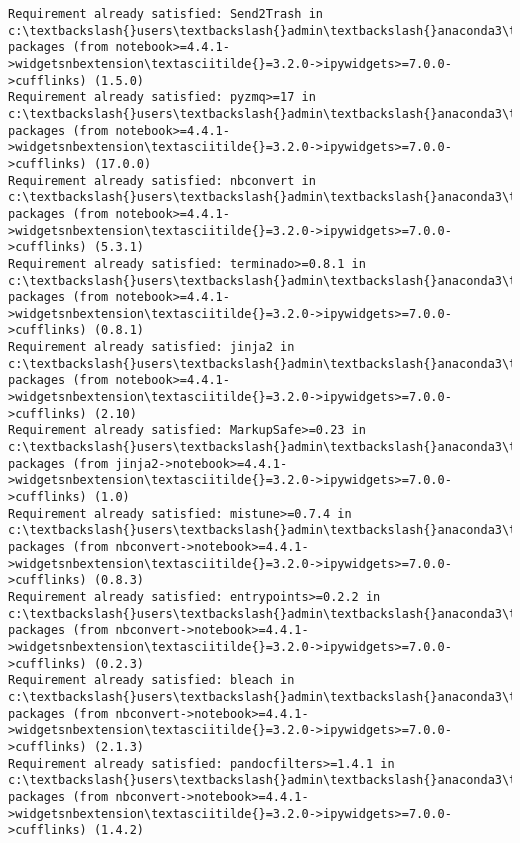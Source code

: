 \documentclass[11pt]{article}
\begin{document}
\begin{Verbatim}[commandchars=\\\{\}]
Requirement already satisfied: Send2Trash in c:\textbackslash{}users\textbackslash{}admin\textbackslash{}anaconda3\textbackslash{}lib\textbackslash{}site-packages (from notebook>=4.4.1->widgetsnbextension\textasciitilde{}=3.2.0->ipywidgets>=7.0.0->cufflinks) (1.5.0)
Requirement already satisfied: pyzmq>=17 in c:\textbackslash{}users\textbackslash{}admin\textbackslash{}anaconda3\textbackslash{}lib\textbackslash{}site-packages (from notebook>=4.4.1->widgetsnbextension\textasciitilde{}=3.2.0->ipywidgets>=7.0.0->cufflinks) (17.0.0)
Requirement already satisfied: nbconvert in c:\textbackslash{}users\textbackslash{}admin\textbackslash{}anaconda3\textbackslash{}lib\textbackslash{}site-packages (from notebook>=4.4.1->widgetsnbextension\textasciitilde{}=3.2.0->ipywidgets>=7.0.0->cufflinks) (5.3.1)
Requirement already satisfied: terminado>=0.8.1 in c:\textbackslash{}users\textbackslash{}admin\textbackslash{}anaconda3\textbackslash{}lib\textbackslash{}site-packages (from notebook>=4.4.1->widgetsnbextension\textasciitilde{}=3.2.0->ipywidgets>=7.0.0->cufflinks) (0.8.1)
Requirement already satisfied: jinja2 in c:\textbackslash{}users\textbackslash{}admin\textbackslash{}anaconda3\textbackslash{}lib\textbackslash{}site-packages (from notebook>=4.4.1->widgetsnbextension\textasciitilde{}=3.2.0->ipywidgets>=7.0.0->cufflinks) (2.10)
Requirement already satisfied: MarkupSafe>=0.23 in c:\textbackslash{}users\textbackslash{}admin\textbackslash{}anaconda3\textbackslash{}lib\textbackslash{}site-packages (from jinja2->notebook>=4.4.1->widgetsnbextension\textasciitilde{}=3.2.0->ipywidgets>=7.0.0->cufflinks) (1.0)
Requirement already satisfied: mistune>=0.7.4 in c:\textbackslash{}users\textbackslash{}admin\textbackslash{}anaconda3\textbackslash{}lib\textbackslash{}site-packages (from nbconvert->notebook>=4.4.1->widgetsnbextension\textasciitilde{}=3.2.0->ipywidgets>=7.0.0->cufflinks) (0.8.3)
Requirement already satisfied: entrypoints>=0.2.2 in c:\textbackslash{}users\textbackslash{}admin\textbackslash{}anaconda3\textbackslash{}lib\textbackslash{}site-packages (from nbconvert->notebook>=4.4.1->widgetsnbextension\textasciitilde{}=3.2.0->ipywidgets>=7.0.0->cufflinks) (0.2.3)
Requirement already satisfied: bleach in c:\textbackslash{}users\textbackslash{}admin\textbackslash{}anaconda3\textbackslash{}lib\textbackslash{}site-packages (from nbconvert->notebook>=4.4.1->widgetsnbextension\textasciitilde{}=3.2.0->ipywidgets>=7.0.0->cufflinks) (2.1.3)
Requirement already satisfied: pandocfilters>=1.4.1 in c:\textbackslash{}users\textbackslash{}admin\textbackslash{}anaconda3\textbackslash{}lib\textbackslash{}site-packages (from nbconvert->notebook>=4.4.1->widgetsnbextension\textasciitilde{}=3.2.0->ipywidgets>=7.0.0->cufflinks) (1.4.2)

\end{Verbatim}
\end{document}
